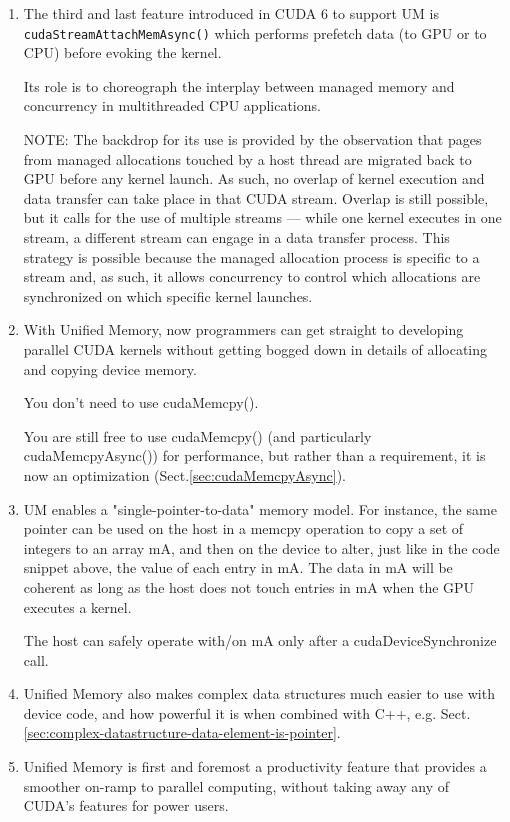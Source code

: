 \begin{enumerate}
  \item The third and last feature introduced in CUDA 6 to support UM is
  \verb!cudaStreamAttachMemAsync()! which performs prefetch data (to GPU or to
  CPU) before evoking the kernel.
  \label{sec:cudaStreamAttachMemAsync()}
  
  Its role is to choreograph the interplay between managed memory and concurrency in multithreaded CPU applications.
  
  NOTE: The backdrop for its use is provided by the observation that pages from
  managed allocations touched by a host thread are migrated back to GPU before
  any kernel launch. As such, no overlap of kernel execution and data transfer
  can take place in that CUDA stream. Overlap is still possible, but it calls
  for the use of multiple streams — while one kernel executes in one stream, a
  different stream can engage in a data transfer process. This strategy is
  possible because the managed allocation process is specific to a stream and,
  as such, it allows concurrency to control which allocations are synchronized
  on which specific kernel launches.

  

  \item   With Unified Memory, now programmers can get straight to developing
  parallel CUDA kernels without getting bogged down in details of allocating and
  copying device memory.
  
  You don't need to use cudaMemcpy().
  
  You are still free to use cudaMemcpy() (and particularly cudaMemcpyAsync())
  for performance, but rather than a requirement, it is now an optimization (Sect.\ref{sec:cudaMemcpyAsync}).
  
  \item UM enables a "single-pointer-to-data" memory model. For instance, the
  same pointer can be used on the host in a memcpy operation to copy a set of
  integers to an array mA, and then on the device to alter, just like in the
  code snippet above, the value of each entry in mA. The data in mA will be
  coherent as long as the host does not touch entries in mA when the GPU
  executes a kernel.
  
  The host can safely operate with/on mA only after a cudaDeviceSynchronize call. 
  
  \item Unified Memory also makes complex data structures much easier to use
  with device code, and how powerful it is when combined with C++, e.g.
  Sect.\ref{sec:complex-datastructure-data-element-is-pointer}.
  
  \item Unified Memory is first and foremost a productivity feature that
  provides a smoother on-ramp to parallel computing, without taking away any of
  CUDA’s features for power users.
  
\end{enumerate}

